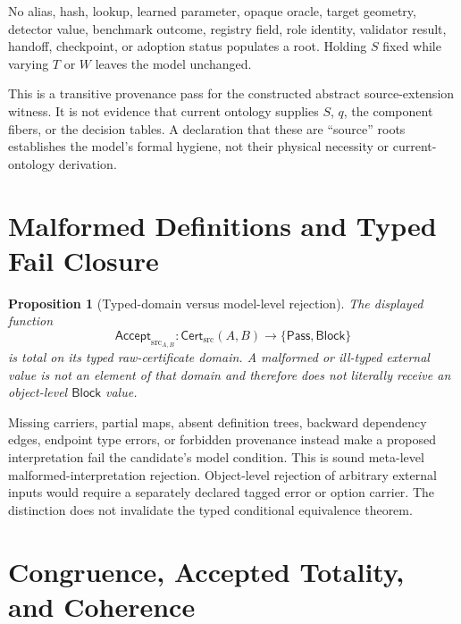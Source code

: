 \documentclass[11pt]{article}
\newtheorem{proposition}{Proposition}
\newcommand{\Cert}{\mathsf{Cert}_{\mathrm{src}}}
\newcommand{\Accept}{\mathsf{Accept}_{\mathrm{src}}}
\newcommand{\Pass}{\mathsf{Pass}}
\newcommand{\Block}{\mathsf{Block}}
\begin{document}
No alias, hash, lookup, learned parameter, opaque oracle, target geometry,
detector value, benchmark outcome, registry field, role identity, validator
result, handoff, checkpoint, or adoption status populates a root. Holding
\(S\) fixed while varying \(T\) or \(W\) leaves the model unchanged.

This is a transitive provenance pass for the constructed abstract
source-extension witness. It is not evidence that current ontology supplies
\(S\), \(q\), the component fibers, or the decision tables. A declaration that
these are ``source'' roots establishes the model's formal hygiene, not their
physical necessity or current-ontology derivation.

\section{Malformed Definitions and Typed Fail Closure}

\begin{proposition}[Typed-domain versus model-level rejection]
The displayed function
\[
 \Accept_{A,B}:\Cert(A,B)\longrightarrow\{\Pass,\Block\}
\]
is total on its typed raw-certificate domain. A malformed or ill-typed
external value is not an element of that domain and therefore does not
literally receive an object-level \(\Block\) value.
\end{proposition}

Missing carriers, partial maps, absent definition trees, backward dependency
edges, endpoint type errors, or forbidden provenance instead make a proposed
interpretation fail the candidate's model condition. This is sound
meta-level malformed-interpretation rejection. Object-level rejection of
arbitrary external inputs would require a separately declared tagged error or
option carrier. The distinction does not invalidate the typed conditional
equivalence theorem.

\section{Congruence, Accepted Totality, and Coherence}
\end{document}
